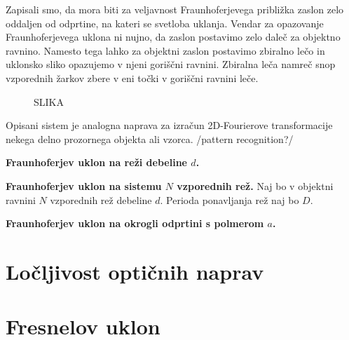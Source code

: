 Zapisali smo, da mora biti za veljavnost Fraunhoferjevega približka zaslon zelo
oddaljen od odprtine, na kateri se svetloba uklanja. Vendar za opazovanje 
Fraunhoferjevega uklona ni nujno, da zaslon postavimo zelo daleč za objektno ravnino.
Namesto tega lahko za objektni zaslon postavimo zbiralno lečo in uklonsko sliko opazujemo
v njeni goriščni ravnini. Zbiralna leča namreč snop vzporednih žarkov zbere v eni 
točki v goriščni ravnini leče. 
\begin{figure}[ht]
\centering
\def\svgwidth{120truemm} 
%
\caption{SLIKA}
\label{fig:05_2DFourier}
\end{figure}
\begin{remark}
Opisani sistem je analogna naprava za izračun 2D-Fourierove transformacije nekega 
delno prozornega objekta ali vzorca. /pattern recognition?/
\end{remark}

\begin{example}{\bf Fraunhoferjev uklon na reži debeline $d$.}
 
\end{example}

\begin{example}{\bf Fraunhoferjev uklon na sistemu $N$ vzporednih rež.}
Naj bo v objektni ravnini $N$ vzporednih rež debeline $d$. Perioda ponavljanja
rež naj bo $D$. 
\end{example}

\begin{example}{\bf Fraunhoferjev uklon na okrogli odprtini s polmerom $a$.}
 
\end{example}



\section{Ločljivost optičnih naprav}

\section{Fresnelov uklon}
